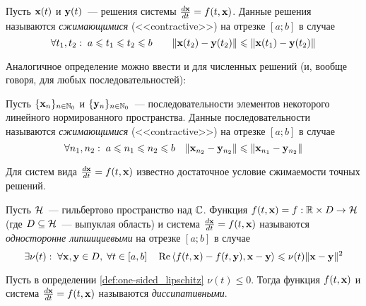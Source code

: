 \begin{definition}
    \label{def:contractivity}
    Пусть $ \mathbf{x}(t) $ и $ \mathbf{y}(t) $~--- решения системы $ \frac{d \mathbf{x}}{d t} = f(t, \mathbf{x}) $.
    Данные решения называются \emph{сжимающимися} (<<contractive>>) на отрезке $ [a; b] $ в случае
    \[
        \forall t_1, t_2: \; a \leqslant t_1 \leqslant t_2 \leqslant b \qquad \| \mathbf{x}(t_2) - \mathbf{y}(t_2) \| \leqslant \| \mathbf{x}(t_1) - \mathbf{y}(t_2) \|
    \]
\end{definition}

Аналогичное определение можно ввести и для численных решений (и, вообще говоря, для любых последовательностей):

\begin{definition}
    \label{def:contractivity_sequence}
    Пусть $ \{\mathbf{x}_n\}_{n \in \mathbb{N}_0} $ и $ \{\mathbf{y}_n\}_{n \in \mathbb{N}_0} $~--- последовательности элементов некоторого линейного нормированного пространства.
    Данные последовательности называются \emph{сжимающимися} (<<contractive>>) на отрезке $ [a; b] $ в случае
    \[
        \forall n_1, n_2: \; a \leqslant n_1 \leqslant n_2 \leqslant b \quad \| \mathbf{x}_{n_2} - \mathbf{y}_{n_2} \| \leqslant \| \mathbf{x}_{n_1} - \mathbf{y}_{n_2} \|
    \]
\end{definition}

Для систем вида $ \frac{d \mathbf{x}}{d t} = f(t, \mathbf{x}) $ известно \cite{auzinger1990note, auzinger1993modern} достаточное условие
сжимаемости точных решений.

\begin{definition}
    \label{def:one-sided_lipschitz}
    Пусть $ \mathcal{H} $~--- гильбертово пространство над $ \mathbb{C} $.
    Функция $ f(t, \mathbf{x}) = f: \mathbb{R} \times D \to \mathcal{H} $
    (где $ D \subseteq \mathcal{H} $~--- выпуклая область)
    и система $ \frac{d \mathbf{x}}{d t} = f(t, \mathbf{x}) $ называются \emph{односторонне липшициевыми} на отрезке $ [a; b] $ в случае
    \[
        \exists \nu(t): \; \forall \mathbf{x}, \mathbf{y} \in D, \; \forall t \in [a, b] \quad
        \operatorname{Re} \left\langle f(t, \mathbf{x}) - f(t, \mathbf{y}), \mathbf{x} - \mathbf{y} \right\rangle \leqslant \nu(t) \| \mathbf{x} - \mathbf{y} \|^2
    \]
\end{definition}

\begin{definition}
    \label{def:dissipative}
    Пусть в определении \ref{def:one-sided_lipschitz} $ \nu(t) \leqslant 0 $.
    Тогда функция $ f(t, \mathbf{x}) $ и система $ \frac{d \mathbf{x}}{d t} = f(t, \mathbf{x}) $ называются \emph{диссипативными}.
\end{definition}

